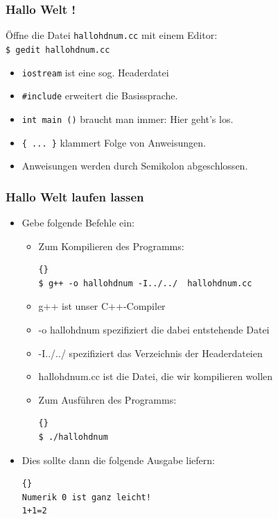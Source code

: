 \documentclass[ignorenonframetext,12pt]{beamer}
\theoremstyle{definition}
\theoremstyle{definition}
\begin{document}
\begin{frame}[fragile]
\frametitle{Hallo Welt !}
Öffne die Datei \lstinline{hallohdnum.cc} mit einem Editor:
\\ \lstinline{$ gedit hallohdnum.cc} %

\begin{itemize}
\item \lstinline{iostream} ist eine sog. \glqq{}Headerdatei\grqq{}
\item \lstinline!#include! erweitert die \glqq{}Basissprache\grqq{}.
\item \lstinline!int main ()! braucht man immer: \glqq{}Hier geht's los\grqq{}.
\item \lstinline!{ ... }! klammert Folge von Anweisungen.
\item Anweisungen werden durch Semikolon abgeschlossen.
\end{itemize}
\end{frame}


\begin{frame}[fragile]
\frametitle{Hallo Welt laufen lassen}
\begin{itemize}
\item Gebe folgende Befehle ein:
\begin{itemize}
\item Zum Kompilieren des Programms:
{\footnotesize\begin{lstlisting}{}
$ g++ -o hallohdnum -I../../  hallohdnum.cc
\end{lstlisting}}
\item g++ ist unser C++-Compiler
\item -o hallohdnum spezifiziert die dabei entstehende Datei
\item -I../../ spezifiziert das Verzeichnis der Headerdateien
\item hallohdnum.cc ist die Datei, die wir kompilieren wollen
\item Zum Ausführen des Programms:
{\small\begin{lstlisting}{}
$ ./hallohdnum
\end{lstlisting}}
\end{itemize}
\item Dies sollte dann die folgende Ausgabe liefern:
{\small\begin{lstlisting}{}
Numerik 0 ist ganz leicht!
1+1=2
\end{lstlisting}}
\end{itemize}
\end{frame}
\end{document}
